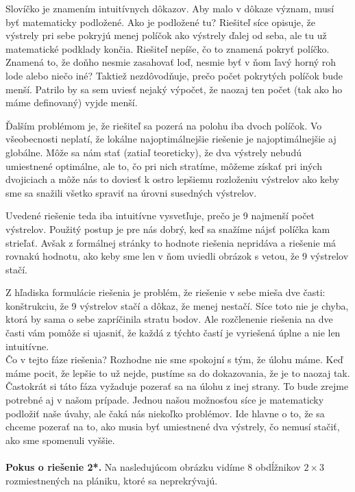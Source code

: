 {{ Slovíčko  je znamením intuitívnych dôkazov. Aby malo v dôkaze význam, musí byť matematicky podložené. Ako je podložené tu? Riešiteľ síce opisuje, že výstrely pri sebe pokryjú menej políčok ako výstrely ďalej od seba, ale tu už matematické podklady končia. Riešiteľ nepíše, čo to znamená pokryť políčko. Znamená to, že doňho nesmie zasahovať loď, nesmie byť v ňom ľavý horný roh lode alebo niečo iné? Taktiež nezdôvodňuje, prečo počet pokrytých políčok bude menší. Patrilo by sa sem uviesť nejaký výpočet, že naozaj ten počet (tak ako ho máme definovaný) vyjde menší.

Ďalším problémom je, že riešiteľ sa pozerá na polohu iba dvoch políčok. Vo všeobecnosti neplatí, že lokálne najoptimálnejšie riešenie je najoptimálnejšie aj globálne. Môže sa nám stať (zatiaľ teoreticky), že dva výstrely nebudú umiestnené optimálne, ale to, čo pri nich stratíme, môžeme získať pri iných dvojiciach a môže nás to doviesť k ostro lepšiemu rozloženiu výstrelov ako keby sme sa snažili všetko spraviť  na úrovni susedných výstrelov.

Uvedené riešenie teda iba intuitívne vysvetľuje, prečo je 9 najmenší počet výstrelov. Použitý postup je pre nás dobrý, keď sa snažíme nájsť políčka kam strieľať. Avšak z formálnej stránky to hodnote riešenia nepridáva a riešenie má rovnakú hodnotu, ako keby sme len v ňom uviedli obrázok s vetou, že 9 výstrelov stačí.

Z hľadiska formulácie riešenia je problém, že riešenie v sebe mieša dve časti: konštrukciu, že 9 výstrelov stačí a dôkaz, že menej nestačí. Síce toto nie je chyba, ktorá by sama o sebe zapríčinila stratu bodov. Ale rozčlenenie riešenia na dve časti vám pomôže si ujasniť, že každá z týchto častí je vyriešená úplne a nie len intuitívne.\\

Čo v tejto fáze riešenia? Rozhodne nie sme spokojní s tým, že úlohu máme. Keď máme pocit, že lepšie to už nejde, pustíme sa do dokazovania, že je to naozaj tak. Častokrát si táto fáza vyžaduje pozerať sa na úlohu z inej strany. To bude zrejme potrebné aj v našom prípade. Jednou našou možnosťou síce je matematicky podložiť naše úvahy, ale čaká nás niekoľko problémov. Ide hlavne o to, že sa chceme pozerať na to, ako musia byť umiestnené dva výstrely, čo nemusí stačiť, ako sme spomenuli vyššie.\\
\\
\textbf{Pokus o riešenie 2*.} Na nasledujúcom obrázku vidíme 8 obdĺžnikov $2\times3$ rozmiestnených na plániku, ktoré sa neprekrývajú.

}}
